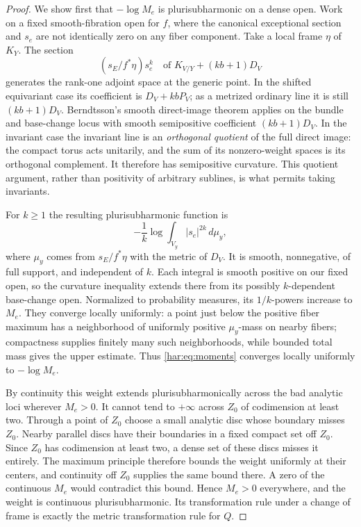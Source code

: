\begin{proof}
We show first that \(-\log M_e\) is plurisubharmonic on a dense open.
Work on a fixed smooth-fibration open for \(f\), where the canonical
exceptional section and \(s_e\) are not identically zero on any fiber
component. Take a local frame \(\eta\) of \(K_Y\). The section
\[
  (s_E/f^*\eta)s_e^k
 \quad\text{of }K_{V/Y}+(kb+1)D_V
\]
generates the rank-one adjoint space at the generic point. In the shifted equivariant case its coefficient is \(D_V+kbP_V\); as a metrized ordinary line it is still \((kb+1)D_V\). Berndtsson's
smooth direct-image theorem \cite[Theorem~1.2]{Berndtsson2009} applies on
the bundle and base-change locus with smooth semipositive coefficient
\((kb+1)D_V\). In the invariant case the invariant line is an
\emph{orthogonal quotient} of the full direct image: the compact torus
acts unitarily, and the sum of its nonzero-weight spaces is its
orthogonal complement. It therefore has semipositive curvature.
This quotient argument, rather than positivity of arbitrary sublines,
is what permits taking invariants.

For $k\ge1$ the resulting plurisubharmonic function is
\begin{equation}\label{har:eq:moments}
 -\frac1k\log\int_{V_y}|s_e|^{2k}\,d\mu_y,
\end{equation}
where \(\mu_y\) comes from \(s_E/f^*\eta\) with the metric of \(D_V\).
It is smooth, nonnegative, of full support, and independent of \(k\).
Each integral is smooth positive on our fixed open, so the curvature
inequality extends there from its possibly \(k\)-dependent base-change
open. Normalized to probability measures, its \(1/k\)-powers increase
to \(M_e\). They converge locally uniformly: a point just below the
positive fiber maximum has a neighborhood of uniformly positive
\(\mu_y\)-mass on nearby fibers; compactness supplies finitely many such
neighborhoods, while bounded total mass gives the upper estimate.
Thus \eqref{har:eq:moments} converges locally uniformly to \(-\log M_e\).

By continuity this weight extends plurisubharmonically across the bad
analytic loci wherever \(M_e>0\). It cannot tend to \(+\infty\) across
\(Z_0\) of codimension at least two. Through a point of $Z_0$ choose
a small analytic disc whose boundary misses $Z_0$. Nearby parallel
discs have their boundaries in a fixed compact set off $Z_0$.
Since $Z_0$ has codimension at least two, a dense set of these discs
misses it entirely. The maximum principle therefore bounds the weight
uniformly at their centers, and continuity off $Z_0$ supplies the
same bound there. A zero of the continuous \(M_e\) would contradict
this bound. Hence \(M_e>0\) everywhere, and the weight is continuous
plurisubharmonic. Its transformation rule under a change of frame is
exactly the metric transformation rule for \(Q\).
\end{proof}
